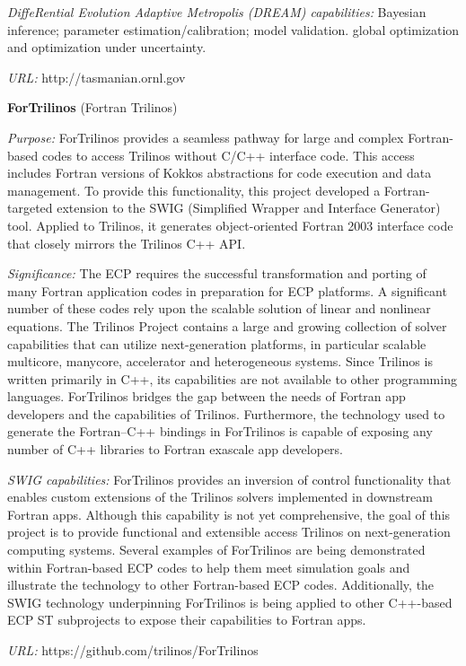{\it DiffeRential Evolution Adaptive Metropolis (DREAM) capabilities:}
Bayesian inference; parameter estimation/calibration; model validation.
global optimization and optimization under uncertainty.

{\it URL:} http://tasmanian.ornl.gov


{\bf ForTrilinos} (Fortran Trilinos)

{\it Purpose:}
ForTrilinos provides a seamless pathway for large and complex Fortran-based
codes to access Trilinos without C/C++ interface code. This access includes
Fortran versions of Kokkos abstractions for code execution and data management.
To provide this functionality, this project developed a Fortran-targeted
extension to the SWIG (Simplified Wrapper and Interface Generator) tool.
Applied to Trilinos, it generates object-oriented Fortran 2003 interface code
that closely mirrors the Trilinos C++ API.

{\it Significance:}
The ECP requires the successful transformation and
porting of many Fortran application codes in preparation for ECP platforms. A
significant number of these codes rely upon the scalable solution of linear and
nonlinear equations. The Trilinos Project contains a large and growing
collection of solver capabilities that can utilize next-generation platforms, in
particular scalable multicore, manycore, accelerator and heterogeneous systems.
Since Trilinos is written primarily in C++, its capabilities are not available
to other programming languages. ForTrilinos bridges the gap between the
needs of Fortran app developers and the capabilities of Trilinos. Furthermore,
the technology used to generate the Fortran--C++ bindings in ForTrilinos is
capable of exposing any number of C++ libraries to Fortran exascale app
developers.


{\it SWIG capabilities:}
ForTrilinos provides an inversion of control functionality that enables custom
extensions of the Trilinos solvers implemented in downstream Fortran apps.
Although this capability is not yet comprehensive, the goal of this project is
to provide functional and extensible access Trilinos on next-generation
computing systems. Several examples of ForTrilinos are being demonstrated within
Fortran-based ECP codes to help them meet simulation goals and illustrate the
technology to other Fortran-based ECP codes. Additionally, the SWIG technology
underpinning ForTrilinos is being applied to other C++-based ECP ST subprojects
to expose their capabilities to Fortran apps.

{\it URL:} https://github.com/trilinos/ForTrilinos

